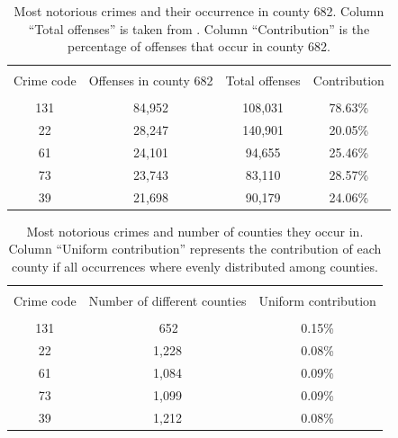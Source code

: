 \documentclass[11pt, english]{article}
\begin{document}
\begin{multicols}{2}
\begin{table}
	\caption{Most notorious crimes and their occurrence in county 682. Column ``Total offenses'' is taken from . Column ``Contribution'' is the percentage of offenses that occur in county 682.}
	\label{tab:notorious-crimes-county}
	\centering
	\begin{tabular}{cccc}
		\hline\hline
		\\[-1.5ex]
		Crime code		&	Offenses in county 682	&	Total offenses		&	Contribution	\\[0.5ex]\hline
		\\[-1.5ex]
		131				&	84,952					&	108,031				&	78.63\%			\\[0.2ex]
		22				&	28,247					&	140,901				&	20.05\%			\\[0.2ex]
		61				&	24,101					&	\hspace{1ex}94,655	&	25.46\%			\\[0.2ex]
		73				&	23,743					&	\hspace{1ex}83,110	&	28.57\%			\\[0.2ex]
		39				&	21,698					&	\hspace{1ex}90,179	&	24.06\%			\\[0.5ex]
		\hline\hline
	\end{tabular}
\end{table}

\begin{table}
	\caption{Most notorious crimes and number of counties they occur in. Column ``Uniform contribution'' represents the contribution of each county if all occurrences where evenly distributed among counties.}
	\label{tab:notorious-crimes-uniform-distribution}
	\centering
	\begin{tabular}{ccc}
		\hline\hline
		\\[-1.5ex]
		Crime code		&	Number of different counties	&	Uniform contribution	\\[0.5ex]\hline
		\\[-1.5ex]
		131				&	\hspace{1ex}\,652				&	0.15\%			\\[0.2ex]
		22				&	1,228							&	0.08\%			\\[0.2ex]
		61				&	1,084							&	0.09\%			\\[0.2ex]
		73				&	1,099							&	0.09\%			\\[0.2ex]
		39				&	1,212							&	0.08\%			\\[0.5ex]
		\hline\hline
	\end{tabular}
\end{table}


\end{multicols}
\end{document}
